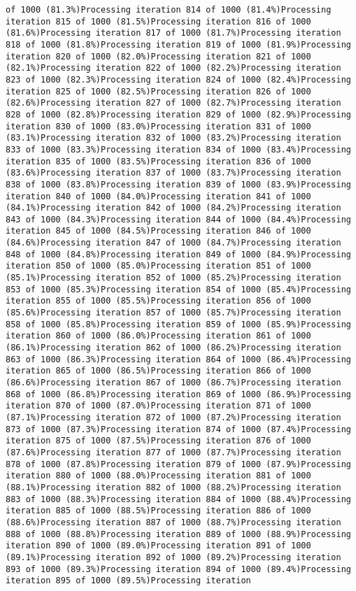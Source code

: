 \documentclass[
]{article}
\begin{document}
\begin{verbatim}
of 1000 (81.3%)Processing iteration 814 of 1000 (81.4%)Processing iteration 815 of 1000 (81.5%)Processing iteration 816 of 1000 (81.6%)Processing iteration 817 of 1000 (81.7%)Processing iteration 818 of 1000 (81.8%)Processing iteration 819 of 1000 (81.9%)Processing iteration 820 of 1000 (82.0%)Processing iteration 821 of 1000 (82.1%)Processing iteration 822 of 1000 (82.2%)Processing iteration 823 of 1000 (82.3%)Processing iteration 824 of 1000 (82.4%)Processing iteration 825 of 1000 (82.5%)Processing iteration 826 of 1000 (82.6%)Processing iteration 827 of 1000 (82.7%)Processing iteration 828 of 1000 (82.8%)Processing iteration 829 of 1000 (82.9%)Processing iteration 830 of 1000 (83.0%)Processing iteration 831 of 1000 (83.1%)Processing iteration 832 of 1000 (83.2%)Processing iteration 833 of 1000 (83.3%)Processing iteration 834 of 1000 (83.4%)Processing iteration 835 of 1000 (83.5%)Processing iteration 836 of 1000 (83.6%)Processing iteration 837 of 1000 (83.7%)Processing iteration 838 of 1000 (83.8%)Processing iteration 839 of 1000 (83.9%)Processing iteration 840 of 1000 (84.0%)Processing iteration 841 of 1000 (84.1%)Processing iteration 842 of 1000 (84.2%)Processing iteration 843 of 1000 (84.3%)Processing iteration 844 of 1000 (84.4%)Processing iteration 845 of 1000 (84.5%)Processing iteration 846 of 1000 (84.6%)Processing iteration 847 of 1000 (84.7%)Processing iteration 848 of 1000 (84.8%)Processing iteration 849 of 1000 (84.9%)Processing iteration 850 of 1000 (85.0%)Processing iteration 851 of 1000 (85.1%)Processing iteration 852 of 1000 (85.2%)Processing iteration 853 of 1000 (85.3%)Processing iteration 854 of 1000 (85.4%)Processing iteration 855 of 1000 (85.5%)Processing iteration 856 of 1000 (85.6%)Processing iteration 857 of 1000 (85.7%)Processing iteration 858 of 1000 (85.8%)Processing iteration 859 of 1000 (85.9%)Processing iteration 860 of 1000 (86.0%)Processing iteration 861 of 1000 (86.1%)Processing iteration 862 of 1000 (86.2%)Processing iteration 863 of 1000 (86.3%)Processing iteration 864 of 1000 (86.4%)Processing iteration 865 of 1000 (86.5%)Processing iteration 866 of 1000 (86.6%)Processing iteration 867 of 1000 (86.7%)Processing iteration 868 of 1000 (86.8%)Processing iteration 869 of 1000 (86.9%)Processing iteration 870 of 1000 (87.0%)Processing iteration 871 of 1000 (87.1%)Processing iteration 872 of 1000 (87.2%)Processing iteration 873 of 1000 (87.3%)Processing iteration 874 of 1000 (87.4%)Processing iteration 875 of 1000 (87.5%)Processing iteration 876 of 1000 (87.6%)Processing iteration 877 of 1000 (87.7%)Processing iteration 878 of 1000 (87.8%)Processing iteration 879 of 1000 (87.9%)Processing iteration 880 of 1000 (88.0%)Processing iteration 881 of 1000 (88.1%)Processing iteration 882 of 1000 (88.2%)Processing iteration 883 of 1000 (88.3%)Processing iteration 884 of 1000 (88.4%)Processing iteration 885 of 1000 (88.5%)Processing iteration 886 of 1000 (88.6%)Processing iteration 887 of 1000 (88.7%)Processing iteration 888 of 1000 (88.8%)Processing iteration 889 of 1000 (88.9%)Processing iteration 890 of 1000 (89.0%)Processing iteration 891 of 1000 (89.1%)Processing iteration 892 of 1000 (89.2%)Processing iteration 893 of 1000 (89.3%)Processing iteration 894 of 1000 (89.4%)Processing iteration 895 of 1000 (89.5%)Processing iteration 
\end{verbatim}
\end{document}
